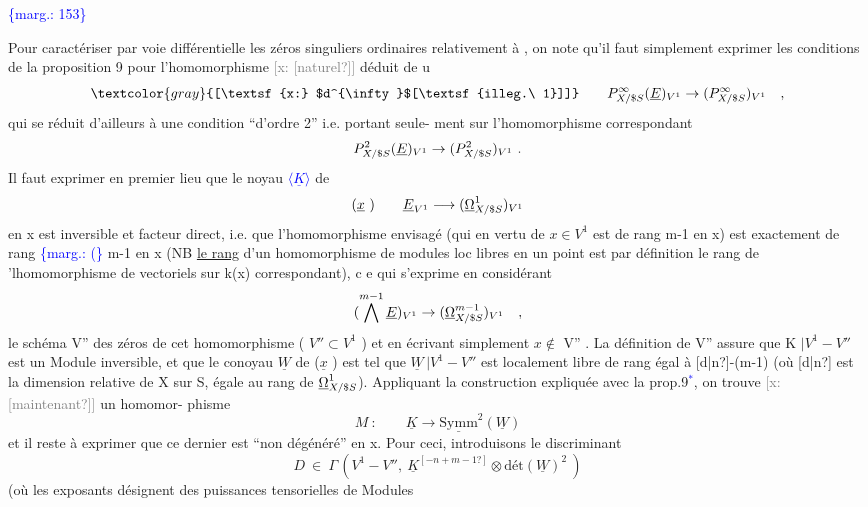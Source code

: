 \documentclass[11pt]{article}
\newcommand{\scanpage}[1]{\par\bigskip\noindent{\small\sffamily[scan #1]}\par}
\newcommand{\mspage}[1]{{\small\sffamily[p.\,#1]}}
\newcommand{\hand}[1]{\textcolor{blue}{#1}}
\let\over\relax
\newcommand{\over}[2]{\textcolor{gray}{#1}\textcolor{blue}{\ensuremath{^{\!\nearrow}}#2}}
\newcommand{\inserted}[2][]{\textcolor{blue}{$\langle$#2$\rangle$}}
\newcommand{\margin}[1]{\textcolor{blue}{\{\textsf{marg.:} #1\}}}
\newcommand{\xout}[1]{\textcolor{gray}{[\textsf{x:} #1]}}
\newcommand{\uline}[1]{\underline{#1}}
\newcommand{\unsure}[1]{[#1?]}
\newcommand{\illegible}[1]{[\textsf{illeg.\ #1}]}
\begin{document}
\margin{153}

\clearpage
\scanpage{25/154}
\mspage{\hand{15}}

Pour caractériser par voie différentielle  les  zéros singuliers ordinaires
relativement à \over{\$}{$S$},  on note qu'il faut simplement exprimer  les conditions
de la proposition 9  pour  l'homomorphisme \xout{\unsure{naturel}} déduit de u
\[ \xout{$d^{\infty}$\illegible{1}} \qquad P^{\infty}_{X/\over{\$}{S}}(\underline{E})_{V^1}\to(P^{\infty}_{X/\over{\$}{S}})_{V^1} \quad , \]
qui se réduit d'ailleurs à une condition  ``d'ordre 2'' i.e. portant seule-%
ment sur l'homomorphisme correspondant
\[ P^{2}_{X/\over{\$}{S}}(\underline{E})_{V^1}\to(P^{2}_{X/\over{\$}{S}})_{V^1} \ . \]
Il faut exprimer en premier lieu  que  le noyau \inserted{$\underline{K}$} de
\[ (\underline{x}\ ) \qquad \underline{E}_{V^1} \longrightarrow (\underline{\Omega}^{1}_{X/\over{\$}{S}})_{V^1} \]
en x est inversible et facteur direct, i.e. que l'homomorphisme envisagé
(qui en vertu de  $x\in V^1$ est  de rang  m-1 en x) est exactement de rang
\margin{(} m-1 en x  (NB \uline{le rang} d'un  homomorphisme de modules loc libres en un
point est par définition le rang de 'lhomomorphisme de vectoriels sur k(x)
correspondant), c e qui s'exprime en considérant
\[ (\bigwedge^{m-1} \underline{E})_{V^1}\to(\underline{\Omega}^{m-1}_{X/\over{\$}{S}})_{V^1} \quad , \]
le  schéma  V'' des zéros de cet homomorphisme  ( $V''\subset V^1$ )  et en écrivant
simplement $x\notin$ V'' .  La définition de V'' assure que  K $|V^1-V''$  est un
Module inversible,  et que  le conoyau  $\underline{W}$  de ($\underline{x}$ )  est tel que
$\underline{W}\,|V^1-V''$  est  localement libre de rang égal à  \unsure{d|n}-(m-1)  (où \unsure{d|n} est la
dimension relative de X sur S, égale au rang de $\underline{\Omega}^{1}_{X/\over{\$}{S}}$).  Appliquant la
construction expliquée avec la prop.9\hand{$^{*}$}, on trouve \xout{\unsure{maintenant}} un homomor-%
phisme
\[ M\ : \qquad \underline{K} \longrightarrow \underline{\mathrm{Symm}}^{2}(\underline{W}) \]
et il reste à exprimer que ce dernier est ``non dégénéré'' en x. Pour ceci,
introduisons le  discriminant
\[ D\ \in\ \Gamma\,(V^1-V'',\ \underline{K}^{\unsure{-n+m-1}}\otimes \text{dét}(\underline{W})^{2}\ ) \]
(où les exposants désignent des puissances tensorielles de Modules
\end{document}
